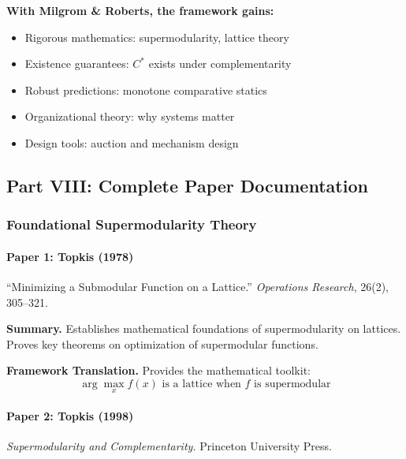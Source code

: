 \textbf{With Milgrom \& Roberts, the framework gains:}
\begin{itemize}
    \item Rigorous mathematics: supermodularity, lattice theory
    \item Existence guarantees: $C^*$ exists under complementarity
    \item Robust predictions: monotone comparative statics
    \item Organizational theory: why systems matter
    \item Design tools: auction and mechanism design
\end{itemize}

\subsection{Part VIII: Complete Paper Documentation}

\subsubsection{Foundational Supermodularity Theory}

\paragraph{Paper 1: Topkis (1978)}

``Minimizing a Submodular Function on a Lattice.''
\textit{Operations Research}, 26(2), 305--321.

\textbf{Summary.}
Establishes mathematical foundations of supermodularity on lattices. 
Proves key theorems on optimization of supermodular functions.

\textbf{Framework Translation.}
Provides the mathematical toolkit:
\begin{equation}
\arg\max_x f(x) \text{ is a lattice when } f \text{ is supermodular}
\end{equation}

\paragraph{Paper 2: Topkis (1998)}

\textit{Supermodularity and Complementarity.}
Princeton University Press.

